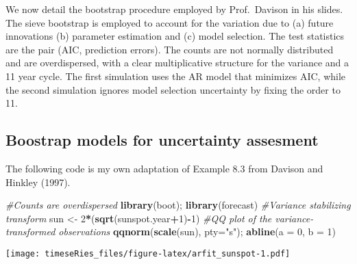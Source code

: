 \documentclass[]{book}
\newenvironment{Shaded}{\begin{snugshade}}{\end{snugshade}}
\newcommand{\KeywordTok}[1]{\textcolor[rgb]{0.13,0.29,0.53}{\textbf{#1}}}
\newcommand{\DataTypeTok}[1]{\textcolor[rgb]{0.13,0.29,0.53}{#1}}
\newcommand{\DecValTok}[1]{\textcolor[rgb]{0.00,0.00,0.81}{#1}}
\newcommand{\StringTok}[1]{\textcolor[rgb]{0.31,0.60,0.02}{#1}}
\newcommand{\CommentTok}[1]{\textcolor[rgb]{0.56,0.35,0.01}{\textit{#1}}}
\newcommand{\OperatorTok}[1]{\textcolor[rgb]{0.81,0.36,0.00}{\textbf{#1}}}
\newcommand{\NormalTok}[1]{#1}
\begin{document}
We now detail the bootstrap procedure employed by Prof.~Davison in his
slides. The sieve bootstrap is employed to account for the variation due
to (a) future innovations (b) parameter estimation and (c) model
selection. The test statistics are the pair (AIC, prediction errors).
The counts are not normally distributed and are overdispersed, with a
clear multiplicative structure for the variance and a 11 year cycle. The
first simulation uses the AR model that minimizes AIC, while the second
simulation ignores model selection uncertainty by fixing the order to
11.

\subsection{Boostrap models for uncertainty
assesment}\label{boostrap-models-for-uncertainty-assesment}

The following code is my own adaptation of Example 8.3 from Davison and
Hinkley (1997).

\begin{Shaded}
\begin{Highlighting}[]
\CommentTok{#Counts are overdispersed}
\KeywordTok{library}\NormalTok{(boot); }\KeywordTok{library}\NormalTok{(forecast)}
\CommentTok{#Variance stabilizing transform}
\NormalTok{sun <-}\StringTok{ }\DecValTok{2}\OperatorTok{*}\NormalTok{(}\KeywordTok{sqrt}\NormalTok{(sunspot.year}\OperatorTok{+}\DecValTok{1}\NormalTok{)}\OperatorTok{-}\DecValTok{1}\NormalTok{)}
\CommentTok{#QQ plot of the variance-transformed observations}
\KeywordTok{qqnorm}\NormalTok{(}\KeywordTok{scale}\NormalTok{(sun), }\DataTypeTok{pty=}\StringTok{"s"}\NormalTok{); }\KeywordTok{abline}\NormalTok{(}\DataTypeTok{a =} \DecValTok{0}\NormalTok{, }\DataTypeTok{b =} \DecValTok{1}\NormalTok{)}
\end{Highlighting}
\end{Shaded}

\texttt{[image: timeseRies\_files/figure-latex/arfit\_sunspot-1.pdf]}
\end{document}
